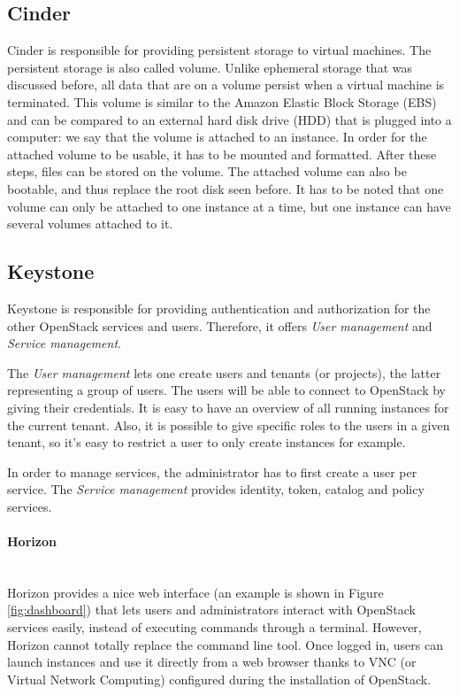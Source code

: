 \subsection{Cinder}
Cinder is responsible for providing persistent storage to virtual machines. 
The persistent storage is also called volume. 
Unlike ephemeral storage that was discussed before, all data that are on a volume persist when a virtual machine is terminated. 
This volume is similar to the Amazon Elastic Block Storage (EBS) 
and can be compared to an external hard disk drive (HDD) that is plugged into a computer: we say that the volume is attached to an instance. 
In order for the attached volume to be usable, it has to be mounted and formatted. 
After these steps, files can be stored on the volume. 
The attached volume can also be bootable, and thus replace the root disk seen before.
It has to be noted that one volume can only be attached to one instance at a time, but one instance can have several volumes attached to it.


\subsection{Keystone}
Keystone is responsible for providing authentication and authorization for the other OpenStack services and users. 
Therefore, it offers \textit{User management} and \textit{Service management}. 

The \textit{User management} lets one create users and tenants (or projects), the latter representing a group of users. 
The users will be able to connect to OpenStack by giving their credentials.
It is easy to have an overview of all running instances for the current tenant.
Also, it is possible to give specific roles to the users in a given tenant, so it's easy to restrict a user to only create instances for example. 

In order to manage services, the administrator has to first create a user per service. 
The \textit{Service management} provides identity, token, catalog and policy services.



\paragraph{Horizon}\mbox{}\\
Horizon provides a nice web interface (an example is shown in Figure \ref{fig:dashboard}) that lets users and administrators interact with OpenStack services easily, instead of executing commands through a terminal. 
However, Horizon cannot totally replace the command line tool.
Once logged in, users can launch instances and use it directly from a web browser thanks to VNC (or Virtual Network Computing) configured during the installation of OpenStack.








